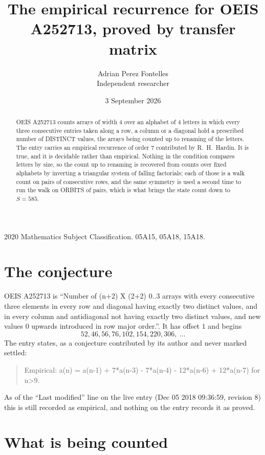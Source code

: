 \documentclass[11pt,a4paper]{article}
\title{The empirical recurrence for OEIS A252713, proved by transfer matrix}
\author{Adrian Perez Fontelles\\ \small Independent researcher}
\date{3 September 2026}
\theoremstyle{plain}
\theoremstyle{definition}
\begin{document}
\maketitle

\begin{abstract}
OEIS A252713 counts arrays of width $4$ over an alphabet of $4$ letters in which every three
consecutive entries taken along a row, a column or a diagonal hold a prescribed number of
DISTINCT values, the arrays being counted up to renaming of the letters. The entry carries an
empirical recurrence of order $7$ contributed by R.~H.~Hardin. It is true, and it is
decidable rather than empirical. Nothing in the condition compares letters by size, so the
count up to renaming is recovered from counts over fixed alphabets by inverting a triangular
system of falling factorials; each of those is a walk count on pairs of consecutive rows, and
the same symmetry is used a second time to run the walk on ORBITS of pairs, which is what
brings the state count down to $S=585$.
\end{abstract}

\noindent\small 2020 Mathematics Subject Classification. 05A15, 05A18, 15A18.\normalsize

\section{The conjecture}

OEIS A252713 is ``Number of (n+2) X (2+2) 0..3 arrays with every consecutive three elements in every row and diagonal having exactly two distinct values, and in every column and antidiagonal not having exactly two distinct values, and new values 0 upwards introduced in row major order.''. It has offset $1$ and begins
\[
52, 46, 56, 76, 102, 154, 220, 306,\ \dots
\]
The entry states, as a conjecture contributed by its author and never marked settled:
\begin{quote}
Empirical: a(n) = a(n-1) + 7*a(n-3) - 7*a(n-4) - 12*a(n-6) + 12*a(n-7) for n>9.
\end{quote}
As of the ``Last modified'' line on the live entry (Dec 05 2018 09:36:59, revision 8) this is still
recorded as empirical, and nothing on the entry records it as proved.

\section{What is being counted}
\end{document}
